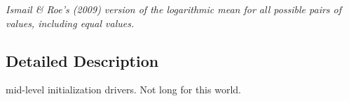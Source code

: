 \begin{DoxyCompactItemize}
\begin{DoxyCompactList}\small\item\em Ismail \& Roe's (2009) version of the logarithmic mean for all possible pairs of values, including equal values. \end{DoxyCompactList}\end{DoxyCompactItemize}


\subsection{Detailed Description}
mid-\/level initialization drivers. Not long for this world. 